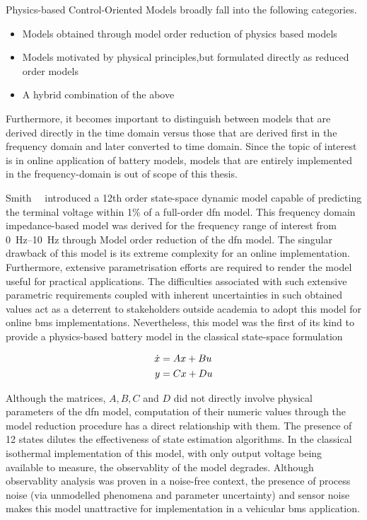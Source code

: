 Physics-based Control-Oriented Models broadly fall into the following categories.

\begin{itemize}
    \item Models obtained through model order reduction of physics based models
    \item Models motivated by physical principles,but formulated directly as reduced order models
    \item A hybrid combination of the above
\end{itemize}

Furthermore, it becomes important to distinguish between models that are derived directly in the time domain versus
those that are derived first in the frequency domain and later converted to time domain. Since the topic of interest is
in online application of battery models, models that are entirely implemented in the frequency-domain is out of scope of
this thesis.

Smith~\etal{}~\cite{Smith2007} introduced a 12th order state-space dynamic model capable of predicting the terminal
voltage within 1\% of a full-order \gls{dfn} model. This frequency domain impedance-based model was derived for the
frequency range of interest from \SIrange{0}{10}{\hertz} through Model order reduction of the \gls{dfn} model. The
singular drawback of this model is its extreme complexity for an online implementation. Furthermore, extensive
parametrisation efforts are required  to
render the model useful for practical applications. The difficulties associated with such extensive parametric
requirements coupled with inherent uncertainties in such obtained values act as a deterrent to stakeholders outside
academia to adopt this model for online \gls{bms} implementations. Nevertheless, this model was the first of its kind to
provide a physics-based battery model in the classical state-space formulation

\begin{align}
    \dot{x} &= Ax + Bu \\\notag
    y &= Cx + Du
\end{align}

Although the matrices, $A, B, C$ and $D$ did not directly involve physical parameters of the \gls{dfn} model,
computation of their numeric values through the model reduction procedure has a direct relationship with them. The
presence of 12 states dilutes the effectiveness of state estimation algorithms. In the classical isothermal
implementation of this model, with only output voltage being available to measure, the observablity of the model
degrades. Although observablity analysis was proven in a noise-free context, the presence of process noise (via
unmodelled phenomena and parameter uncertainty) and sensor noise makes this model unattractive for implementation in a
vehicular \gls{bms} application.

